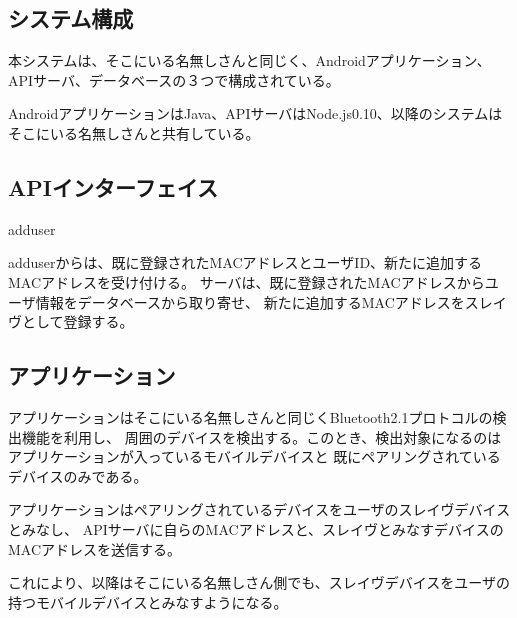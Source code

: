 \subsection{システム構成}

本システムは、そこにいる名無しさんと同じく、Androidアプリケーション、APIサーバ、データベースの３つで構成されている。

AndroidアプリケーションはJava、APIサーバはNode.js0.10、以降のシステムはそこにいる名無しさんと共有している。

\subsection{APIインターフェイス}

\begin{description}

  \item{adduser}

adduserからは、既に登録されたMACアドレスとユーザID、新たに追加するMACアドレスを受け付ける。
サーバは、既に登録されたMACアドレスからユーザ情報をデータベースから取り寄せ、
新たに追加するMACアドレスをスレイヴとして登録する。

\end{description}

\subsection{アプリケーション}

アプリケーションはそこにいる名無しさんと同じくBluetooth2.1プロトコルの検出機能を利用し、
周囲のデバイスを検出する。このとき、検出対象になるのはアプリケーションが入っているモバイルデバイスと
既にペアリングされているデバイスのみである。

アプリケーションはペアリングされているデバイスをユーザのスレイヴデバイスとみなし、
APIサーバに自らのMACアドレスと、スレイヴとみなすデバイスのMACアドレスを送信する。

これにより、以降はそこにいる名無しさん側でも、スレイヴデバイスをユーザの持つモバイルデバイスとみなすようになる。


